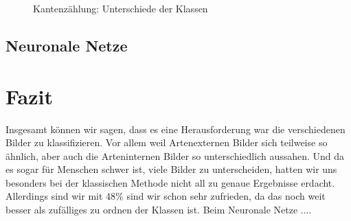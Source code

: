 \documentclass[a4,german]{article}
\begin{document}
\begin{figure}[h!]%
\caption{Kantenzählung: Unterschiede der Klassen}
    \label{fig:kbs}
\end{figure}

\subsection{Neuronale Netze}


\section{Fazit}


Insgesamt können wir sagen, dass es eine Herausforderung war die verschiedenen Bilder zu klassifizieren. Vor allem weil Artenexternen Bilder sich teilweise so ähnlich, aber auch die Arteninternen Bilder so unterschiedlich aussahen. Und da es sogar für Menschen schwer ist, viele Bilder zu unterscheiden, hatten wir uns besonders bei der klassischen Methode nicht all zu genaue Ergebnisse erdacht.
Allerdings sind wir mit 48\% sind wir schon sehr zufrieden, da das noch weit besser als zufälliges zu ordnen der Klassen ist.
Beim Neuronale Netze ....
\end{document}
